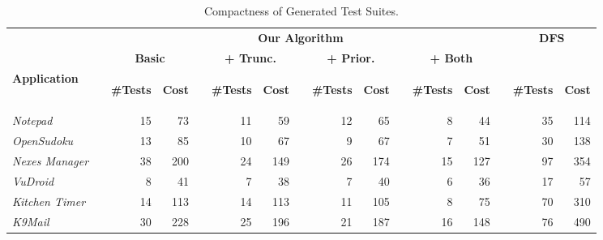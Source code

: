 \begin{table}[t!]
\vspace*{-3ex}
\centering
\caption{Compactness of Generated Test Suites.}
\label{table:algoEffectiveness}
{
\begin{tabular}{@{}lr@{}rrr@{}rrr@{}rrr@{}rrr@{}rr@{}}
\toprule
&&\multicolumn{11}{c}{\bf{Our Algorithm}}
&&\multicolumn{2}{c}{\bf{DFS}}\\
&&\multicolumn{2}{c}{\bf{Basic}}
&&\multicolumn{2}{c}{\bf{+ Trunc.}}
&&\multicolumn{2}{c}{\bf{+ Prior.}}
&&\multicolumn{2}{c}{\bf{+ Both}}
\\
\cmidrule{3-4}
\cmidrule{6-7}
\cmidrule{9-10}
\cmidrule{12-13}
\cmidrule{15-16}
\bf{Application}&&\begin{sideways}\bf{\#Tests}\end{sideways}&\begin{sideways}\bf{Cost}\end{sideways}&&\begin{sideways}\bf{\#Tests}\end{sideways}&\begin{sideways}\bf{Cost}\end{sideways}&&\begin{sideways}\bf{\#Tests}\end{sideways}&\begin{sideways}\bf{Cost}\end{sideways}&&\begin{sideways}\bf{\#Tests}\end{sideways}&\begin{sideways}\bf{Cost}\end{sideways}&&\begin{sideways}\bf{\#Tests}\end{sideways}&\begin{sideways}\bf{Cost}\end{sideways}\\
\midrule
\textit{Notepad}&&15&73&&11&59&&12&65&&8&44&&35&114\\
\textit{OpenSudoku}&&13&85&&10&67&&9&67&&7&51&&30&138\\
\textit{Nexes Manager}&&38&200&&24&149&&26&174&&15&127&&97&354\\
\midrule
\textit{VuDroid}&&8&41&&7&38&&7&40&&6&36&&17&57\\
\textit{Kitchen Timer}&&14&113&&14&113&&11&105&&8&75&&70&310\\
\textit{K9Mail}&&30&228&&25&196&&21&187&&16&148&&76&490\\
\bottomrule
\end{tabular}
}
\end{table}
